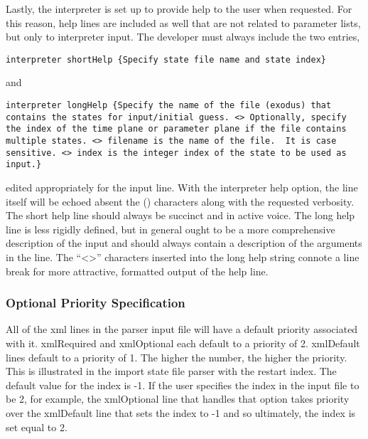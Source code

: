 Lastly, the interpreter is set up to provide help to the user when
requested.  For this reason, help lines are included as well that are
not related to parameter lists, but only to interpreter input.  The
developer must always include the two entries,
\begin{lstlisting}
interpreter shortHelp {Specify state file name and state index}
\end{lstlisting}
and
\begin{lstlisting}
interpreter longHelp {Specify the name of the file (exodus) that contains the states for input/initial guess. <> Optionally, specify the index of the time plane or parameter plane if the file contains multiple states. <> filename is the name of the file.  It is case sensitive. <> index is the integer index of the state to be used as input.}
\end{lstlisting}
edited appropriately for the input line.  With the interpreter help
option, the line itself will be echoed absent the () characters along
with the requested verbosity. The short help line should always be
succinct and in active voice.  The long help line is less rigidly
defined, but in general ought to be a more comprehensive description
of the input and should always contain a description of the arguments
in the line.  The ``<>'' characters inserted into the long help string
connote a line break for more attractive, formatted output of the help
line.

\subsubsection{Optional Priority Specification}

All of the xml lines in the parser input file will have a default
priority associated with it.  xmlRequired and xmlOptional each default
to a priority of 2.  xmlDefault lines default to a priority of 1.  The
higher the number, the higher the priority.  This is illustrated in
the import state file parser with the restart index.  The default
value for the index is -1.  If the user specifies the index in the
input file to be 2, for example, the xmlOptional line that handles
that option takes priority over the xmlDefault line that sets the
index to -1 and so ultimately, the index is set equal to 2.

